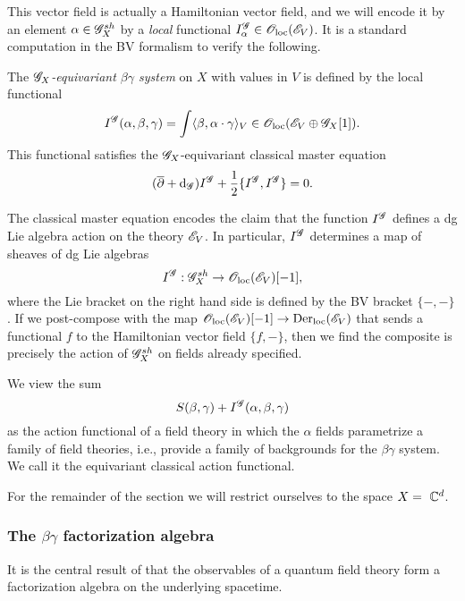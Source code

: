 This vector field is actually a Hamiltonian vector field, 
and we will encode it by an element $\alpha \in \mathscr G_X^{sh}$ by a {\em local} functional $I_\alpha^{\mathscr G} \in {\mathscr O}_{\rm loc}(\mathscr E_V)$. 
It is a standard computation in the BV formalism to verify the following.

\begin{dfn/lem}
The {\em $\mathscr G_X$-equivariant $\beta\gamma$ system} on $X$ with values in $V$ is defined by the local functional
\[
I^{\mathscr G}(\alpha, \beta, \gamma) = \int \langle\beta, \alpha \cdot \gamma\rangle_V \in {\mathscr O}_{\rm loc}(\mathscr E_V \oplus \mathscr G_X[1]) .
\]
This functional satisfies the $\mathscr G_X$-equivariant classical master equation
\[
(\overline{\partial} + {\rm d}_{\mathscr G}) I^{\mathscr G} + \frac{1}{2} \{I^{\mathscr G}, I^{\mathscr G}\} = 0 .
\] 
\end{dfn/lem}

The classical master equation encodes the claim that the function $I^{\mathscr G}$ defines a dg Lie algebra action on the theory $\mathscr E_V$. 
In particular, $I^{\mathscr G}$ determines a map of sheaves of dg Lie algebras 
\[
I^{\mathscr G} : \mathscr G^{sh}_X \to {\mathscr O}_{\rm loc}(\mathscr E_V)[-1],
\] 
where the Lie bracket on the right hand side is defined by the BV bracket $\{-,-\}$. 
If we post-compose with the map ${\mathscr O}_{\rm loc}(\mathscr E_V)[-1] \to {\rm Der}_{\rm loc}(\mathscr E_V)$ that sends a functional $f$ to the Hamiltonian vector field $\{f,-\}$,
then we find the composite is precisely the action of $\mathscr G^{sh}_X$ on fields already specified.

We view the sum 
\[
S(\beta,\gamma) + I^{\mathscr G}(\alpha, \beta, \gamma)
\] 
as the action functional of a field theory in which the $\alpha$ fields parametrize a family of field theories,
i.e., provide a family of backgrounds for the $\beta\gamma$ system.
We call it the equivariant classical action functional.

 For the remainder of the section we will restrict ourselves to the space $X =~\mathbb C^d$. 

\subsubsection{The $\beta\gamma$ factorization algebra}

It is the central result of \cite{CG1,CG2} that the observables of a quantum field theory form a factorization algebra on the underlying spacetime. 

